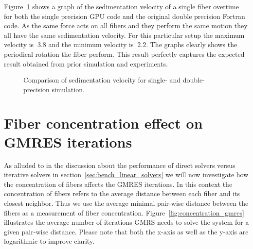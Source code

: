 \documentclass[a4paper,11pt]{kth-mag}
\begin{document}
Figure~\ref{fig:ring_sedimentation_velocity} shows a graph of the sedimentation velocity of a single fiber overtime for both the single precision GPU code and the original double precision Fortran code. As the same force acts on all fibers and they perform the same motion they all have the same sedimentation velocity. For this particular setup the maximum velocity is $~3.8$ and the minimum velocity is $~2.2$. The graphs clearly shows the periodical rotation the fiber perform. This result perfectly captures the expected result obtained from prior simulation and experiments.

\begin{figure}[!htbp]
  \centering
  \caption{Comparison of sedimentation velocity for single- and double-precision simulation.}
  \label{fig:ring_sedimentation_velocity}
\end{figure}

\section{Fiber concentration effect on GMRES iterations}
\label{sec:example_concentration_gmres}

As alluded to in the discussion about the performance of direct solvers versus iterative solvers in section~\ref{sec:bench_linear_solvers} we will now investigate how the concentration of fibers affects the GMRES iterations. In this context the concentration of fibers refers to the average distance between each fiber and its closest neighbor. Thus we use the average minimal pair-wise distance between the fibers as a measurement of fiber concentration. Figure~\ref{fig:concentration_gmres} illustrates the average number of iterations GMRS needs to solve the system for a given pair-wise distance. Please note that both the x-axis as well as the y-axis are logarithmic to improve clarity.
\end{document}
